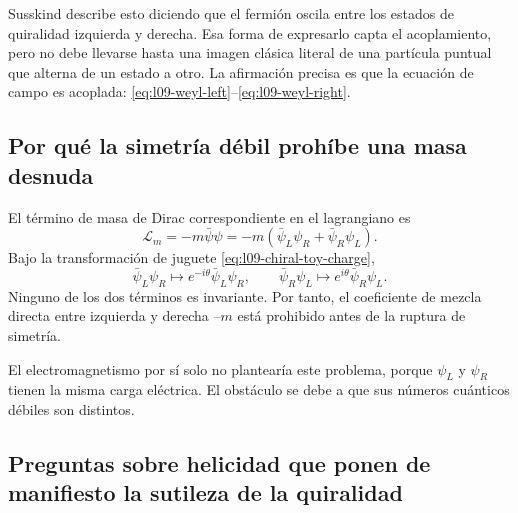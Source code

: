 Susskind describe esto diciendo que el fermión oscila entre los estados de quiralidad izquierda y derecha. Esa forma de expresarlo capta el acoplamiento, pero no debe llevarse hasta una imagen clásica literal de una partícula puntual que alterna de un estado a otro. La afirmación precisa es que la ecuación de campo es acoplada:
\eqref{eq:l09-weyl-left}--\eqref{eq:l09-weyl-right}.

\begin{classroomqa}
\end{classroomqa}

\subsection{Por qué la simetría débil prohíbe una masa desnuda}

El término de masa de Dirac correspondiente en el lagrangiano es
\begin{equation}
  \mathcal L_m
  =-m\bar\psi\psi
  =-m\left(\bar\psi_L\psi_R+\bar\psi_R\psi_L\right).
  \label{eq:l09-bare-dirac-mass}
\end{equation}
Bajo la transformación de juguete \eqref{eq:l09-chiral-toy-charge},
\begin{equation}
  \bar\psi_L\psi_R\longmapsto
  e^{-i\theta}\bar\psi_L\psi_R,
  \qquad
  \bar\psi_R\psi_L\longmapsto
  e^{i\theta}\bar\psi_R\psi_L.
\end{equation}
Ninguno de los dos términos es invariante. Por tanto, el coeficiente de mezcla directa entre izquierda y derecha --\(m\) está prohibido antes de la ruptura de simetría.

El electromagnetismo por sí solo no plantearía este problema, porque \(\psi_L\) y \(\psi_R\) tienen la misma carga eléctrica. El obstáculo se debe a que sus números cuánticos débiles son distintos.

\subsection{Preguntas sobre helicidad que ponen de manifiesto la sutileza de la quiralidad}

